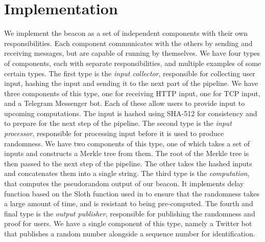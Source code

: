 \section{Implementation}
\label{sec:implementation}



We implement the beacon as  a set of independent components with their own responsibilities. Each component communicates with the others by sending and receiving messages, but are capable of running by themselves. We have four types of components, each with separate responsibilities, and multiple examples of some certain types.
The first type is the \emph{input collector}, responsible for collecting user input, hashing the input and sending it to the next part of the pipeline. We have three components of this type, one for receiving HTTP input, one for TCP input, and a Telegram Messenger bot. Each of these allow users to provide input to upcoming computations. The input is hashed using SHA-512 for consistency and to prepare for the next step of the pipeline.
The second type is the \emph{input processor}, responsible for processing input before it is used to produce randomness. We have two components of this type, one of which takes a set of inputs and constructs a Merkle tree from them. The root of the Merkle tree is then passed to the next step of the pipeline. The other takes the hashed inputs and concatenates them into a single string.
The third type is the \emph{computation}, that computes the pseudorandom output of our beacon. It implements delay function based on the Sloth function used in \cite{randomzoo} to ensure that the randomness takes a large amount of time, and is resistant to being pre-computed.
The fourth and final type is the \emph{output publisher}, responsible for publishing the randomness and proof for users. We have a single component of this type, namely a Twitter bot that publishes a random number alongside a sequence number for identification.

